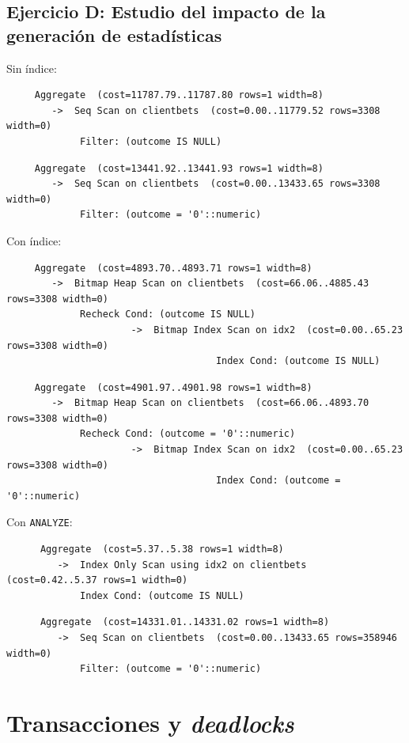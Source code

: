 \documentclass{article}
\begin{document}
\subsection{Ejercicio D: {\small Estudio del impacto de la generación de estadísticas}}
Sin índice:
\begin{lstlisting}
     Aggregate  (cost=11787.79..11787.80 rows=1 width=8)
        ->  Seq Scan on clientbets  (cost=0.00..11779.52 rows=3308 width=0)
             Filter: (outcome IS NULL)
\end{lstlisting}
\begin{lstlisting}
     Aggregate  (cost=13441.92..13441.93 rows=1 width=8)
        ->  Seq Scan on clientbets  (cost=0.00..13433.65 rows=3308 width=0)
             Filter: (outcome = '0'::numeric)
\end{lstlisting}
Con índice:
\begin{lstlisting}
     Aggregate  (cost=4893.70..4893.71 rows=1 width=8)
        ->  Bitmap Heap Scan on clientbets  (cost=66.06..4885.43 rows=3308 width=0)
             Recheck Cond: (outcome IS NULL)
                      ->  Bitmap Index Scan on idx2  (cost=0.00..65.23 rows=3308 width=0)
                                     Index Cond: (outcome IS NULL)
\end{lstlisting}
\begin{lstlisting}
     Aggregate  (cost=4901.97..4901.98 rows=1 width=8)
        ->  Bitmap Heap Scan on clientbets  (cost=66.06..4893.70 rows=3308 width=0)
             Recheck Cond: (outcome = '0'::numeric)
                      ->  Bitmap Index Scan on idx2  (cost=0.00..65.23 rows=3308 width=0)
                                     Index Cond: (outcome = '0'::numeric)
\end{lstlisting}
Con \texttt{ANALYZE}:
\begin{lstlisting}
      Aggregate  (cost=5.37..5.38 rows=1 width=8)
         ->  Index Only Scan using idx2 on clientbets  (cost=0.42..5.37 rows=1 width=0)
             Index Cond: (outcome IS NULL)
\end{lstlisting}
\begin{lstlisting}
      Aggregate  (cost=14331.01..14331.02 rows=1 width=8)
         ->  Seq Scan on clientbets  (cost=0.00..13433.65 rows=358946 width=0)
             Filter: (outcome = '0'::numeric)
\end{lstlisting}
\section{Transacciones y \textit{deadlocks}}
\end{document}

